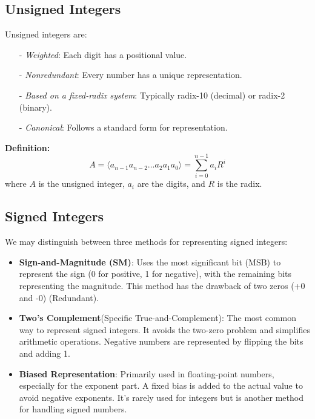 \subsection{Unsigned Integers}
Unsigned integers are:
\begin{itemize}
    \item[-] \textit{Weighted}: Each digit has a positional value.
    \item[-] \textit{Nonredundant}: Every number has a unique representation.
    \item[-] \textit{Based on a fixed-radix system}: Typically radix-10 (decimal) or radix-2 (binary).
    \item[-] \textit{Canonical}: Follows a standard form for representation.
\end{itemize}

\textbf{Definition:}
\[
A = \langle a_{n-1} a_{n-2} \dots a_2 a_1 a_0 \rangle = \sum_{i=0}^{n-1} a_i R^i
\]
where \(A\) is the unsigned integer, \(a_i\) are the digits, and \(R\) is the radix.

\subsection{Signed Integers}
We may distinguish between three methods for representing signed integers:
\begin{itemize}
    \item \textbf{Sign-and-Magnitude (SM)}: Uses the most significant bit (MSB) to represent the sign (0 for positive, 1 for negative), with the remaining bits representing the magnitude. This method has the drawback of two zeros (+0 and -0) (Redundant).
    \item \textbf{Two's Complement}(Specific True-and-Complement): The most common way to represent signed integers. It avoids the two-zero problem and simplifies arithmetic operations. Negative numbers are represented by flipping the bits and adding 1.
    \item \textbf{Biased Representation}: Primarily used in floating-point numbers, especially for the exponent part. A fixed bias is added to the actual value to avoid negative exponents. It's rarely used for integers but is another method for handling signed numbers.
\end{itemize}
